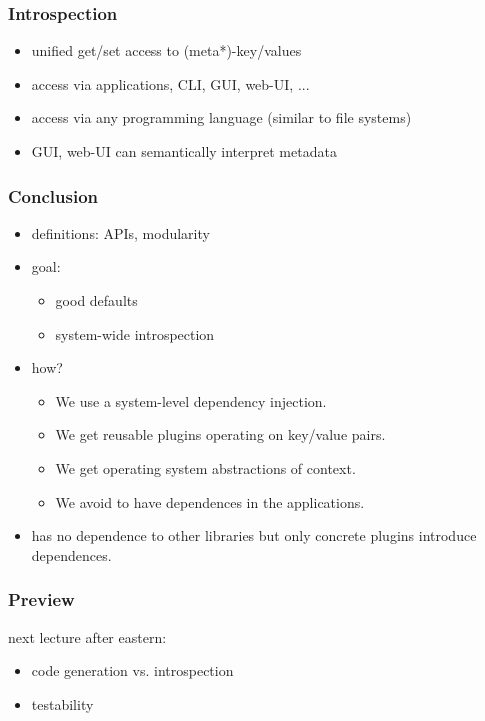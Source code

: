 \begin{frame}
	\frametitle{Introspection}
	\begin{itemize}
	\item unified get/set access to (meta*)-key/values
	\item access via applications, CLI, GUI, web-UI, ...
	\item access via any programming language (similar to file systems)
	\item GUI, web-UI can semantically interpret metadata
	\end{itemize}
\end{frame}



\begin{frame}
	\frametitle{Conclusion}
	\begin{itemize}
	\item definitions: APIs, modularity
	\item goal:
		\begin{itemize}
		\item good defaults
		\item system-wide introspection
		\end{itemize}
	\item how?
		\begin{itemize}
		\item We use a system-level dependency injection.
		\item We get reusable plugins operating on key/value pairs.
		\item We get operating system abstractions of context.
		\item We avoid to have dependences in the applications.
		\end{itemize}
	\item \elektra{} has no dependence to other libraries but only concrete plugins introduce dependences.
	\end{itemize}
\end{frame}



\begin{frame}
	\frametitle{Preview}
	next lecture after eastern:
	\begin{itemize}
	\item code generation vs. introspection
	\item testability
	\end{itemize}
\end{frame}



\nocite{raab2016improving}

\appendix

\begin{frame}[allowframebreaks]
	
	
\end{frame}




